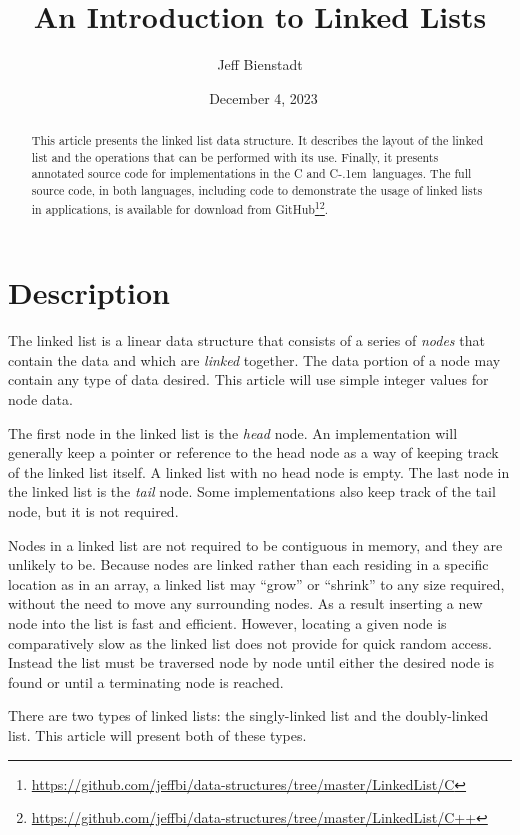 \documentclass{article}
\newcommand{\Cpp}{\mbox{C\kern-.1em\raisebox{.35ex}{\smaller{\smaller{+\kern-0.05em+}}}}}
\begin{document}
  \title{An Introduction to Linked Lists}
  \author{Jeff Bienstadt}
  \date{\textcopyright\ December 4, 2023}
  \maketitle
  \begin{abstract}
    This article presents the linked list data structure. It describes the layout of the linked list and the operations that can be performed with its use. Finally, it presents annotated source code for implementations in the C and \Cpp\ languages. The full source code, in both languages, including code to demonstrate the usage of linked lists in applications, is available for download from GitHub\footnote{\url{https://github.com/jeffbi/data-structures/tree/master/LinkedList/C}}\footnote{\url{https://github.com/jeffbi/data-structures/tree/master/LinkedList/C++}}.
  \end{abstract}
  \part{Description}\label{part:description}
  The linked list is a linear data structure that consists of a series of \emph{nodes} that contain the data and which are \emph{linked} together. The data portion of a node may contain any type of data desired. This article will use simple integer values for node data.

  The first node in the linked list is the \emph{head} node. An implementation will generally keep a pointer or reference to the head node as a way of keeping track of the linked list itself. A linked list with no head node is empty. The last node in the linked list is the \emph{tail} node. Some implementations also keep track of the tail node, but it is not required.

  Nodes in a linked list are not required to be contiguous in memory, and they are unlikely to be. Because nodes are linked rather than each residing in a specific location as in an array, a linked list may ``grow'' or ``shrink'' to any size required, without the need to move any surrounding nodes. As a result inserting a new node into the list is fast and efficient. However, locating a given node is comparatively slow as the linked list does not provide for quick random access. Instead the list must be traversed node by node until either the desired node is found or until a terminating node is reached.

  There are two types of linked lists: the singly-linked list and the doubly-linked list. This article will present both of these types.
\end{document}
